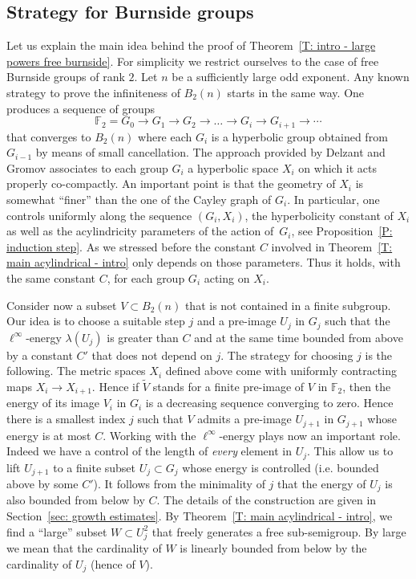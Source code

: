 \documentclass[JEP,XML,SOM,Unicode, NoEqCountersInSection,published]{cedram}
\theoremstyle{plain}
\theoremstyle{definition}
\begin{document}
\subsection{Strategy for Burnside groups}
\label{sec: strategy for burnside groups}
Let us explain the main idea behind the proof of Theorem~\ref{T: intro - large powers free burnside}.
For simplicity we restrict ourselves to the case of free Burnside groups of rank $2$.
Let $n$ be a sufficiently large odd exponent.
Any known strategy to prove the infiniteness of $B_2(n)$ starts in the same way.
One produces a sequence of groups
\begin{equation}
\label{eqn: approx sequence}
\mathbb F_2 = G_0 \to G_1 \to G_2 \to \dots \to G_i \to G_{i +1} \to \cdots
\end{equation}
that converges to $B_2(n)$ where each $G_i$ is a hyperbolic group obtained from $G_{i-1}$ by means of small cancellation.
The approach provided by Delzant and Gromov associates to each group $G_i$ a hyperbolic space $X_i$ on which it acts properly co-compactly.
An important point is that the geometry of $X_i$ is somewhat ``finer'' than the one of the Cayley graph of $G_i$.
In particular, one controls uniformly along the sequence $(G_i, X_i)$, the hyperbolicity constant of $X_i$ as well as the acylindricity parameters of the action of~$G_i$, see Proposition~\ref{P: induction step}.
As we stressed before the constant $C$ involved in Theorem~\ref{T: main acylindrical - intro} only depends on those parameters.
Thus it holds, with the same constant $C$, for each group $G_i$ acting on $X_i$.

Consider now a subset $V\subset B_2(n)$ that is not contained in a finite subgroup.
Our idea is to choose a suitable step $j$ and a pre-image $U_j$ in $G_j$ such that the $\ell^\infty$-energy $\lambda(U_j)$ is greater than $C$ and at the same time bounded from above by a constant $C'$ that does not depend on $j$.
The strategy for choosing $j$ is the following.
The metric spaces $X_i$ defined above come with uniformly contracting maps $X_i \to X_{i+1}$.
Hence if $\tilde V$ stands for a finite pre-image of $V$ in $\mathbb F_2$, then the energy of its image $V_i$ in $G_i$ is a decreasing sequence converging to zero.
Hence there is a smallest index $j$ such that $V$ admits a pre-image $U_{j+1}$ in $G_{j+1}$ whose energy is at most $C$.
Working with the $\ell^\infty$-energy plays now an important role.
Indeed we have a control of the length of \emph{every} element in $U_j$.
This allow us to lift $U_{j+1}$ to a finite subset $U_j \subset G_j$ whose energy is controlled (i.e. bounded above by some $C'$).
It follows from the minimality of $j$ that the energy of $U_j$ is also bounded from below by $C$.
The details of the construction are given in Section~\ref{sec: growth estimates}.
By Theorem~\ref{T: main acylindrical - intro}, we find a ``large'' subset $W \subset U_j^2$ that freely generates a free sub-semigroup.
By large we mean that the cardinality of $W$ is linearly bounded from below by the cardinality of $U_j$ (hence of $V$).
\end{document}
